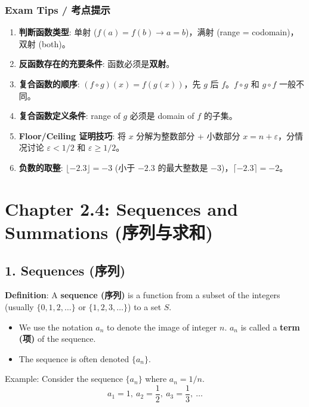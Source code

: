 \documentclass[10pt,a4paper,openany]{ctexbook}
\theoremstyle{definition}
\theoremstyle{remark}
\begin{document}
\subsubsection{Exam Tips / 考点提示}

\begin{enumerate}
\item \textbf{判断函数类型}: 单射 ($f(a)=f(b) \to a=b$)，满射 (range = codomain)，双射 (both)。
\item \textbf{反函数存在的充要条件}: 函数必须是\textbf{双射}。
\item \textbf{复合函数的顺序}: $(f \circ g)(x) = f(g(x))$，先 $g$ 后 $f$。$f \circ g$ 和 $g \circ f$ 一般不同。
\item \textbf{复合函数定义条件}: range of $g$ 必须是 domain of $f$ 的子集。
\item \textbf{Floor/Ceiling 证明技巧}: 将 $x$ 分解为整数部分 + 小数部分 $x = n + \varepsilon$，分情况讨论 $\varepsilon < 1/2$ 和 $\varepsilon \ge 1/2$。
\item \textbf{负数的取整}: $\lfloor -2.3 \rfloor = -3$ (小于 $-2.3$ 的最大整数是 $-3$)，$\lceil -2.3 \rceil = -2$。

\end{enumerate}


\section{Chapter 2.4: Sequences and Summations (序列与求和)}

\vspace{-2pt}

\subsection{1. Sequences (序列)}

\textbf{Definition}: A \textbf{sequence (序列)} is a function from a subset of the integers (usually $\{0,1,2,\dots\}$ or $\{1,2,3,\dots\}$) to a set $S$.
\begin{itemize}
\item We use the notation $a_n$ to denote the image of integer $n$. $a_n$ is called a \textbf{term (项)} of the sequence.
\item The sequence is often denoted $\{a_n\}$.

\end{itemize}

Example: Consider the sequence $\{a_n\}$ where $a_n = 1/n$.
\[
a_1 = 1,\ a_2 = \frac{1}{2},\ a_3 = \frac{1}{3},\ \dots
\]
\end{document}
